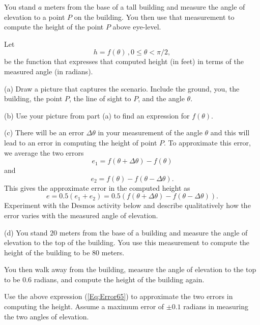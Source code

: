 \documentclass{ximera}
\begin{document}
\begin{question} \label{Q1:RightTriangle}
You stand $a$ meters from the base of a tall building and measure the angle of  elevation to a point $P$ on the building. You then use that measurement to compute the height of the point $P$ above eye-level.

Let 
\[
    h = f(\theta) \, , 0\leq \theta < \pi/2 ,
\]
be the function that expresses that computed height (in feet) in terms of the measured angle (in radians).

(a) Draw a picture that captures the scenario. Include the ground, you, the building, the point $P$, the line of sight to $P$, and the angle $\theta$.

(b) Use your picture from part (a) to find an expression for $f(\theta)$.

(c) There will be an error $\Delta \theta$ in your measurement of the angle $\theta$ and this will lead to an error in computing the height of point $P$.  To approximate this error, we average the two errors
\[
     e_1 = f(\theta + \Delta\theta) - f(\theta)
\]
and 
\[
   e_2 = f(\theta) - f(\theta - \Delta\theta).
\]
This gives the approximate error in the computed height as
\begin{equation}
   e =   0.5 (e_1 + e_2) = 0.5 \left(  f(\theta + \Delta\theta) - f(\theta - \Delta\theta)     \right) . \label{Eq:Error65}
\end{equation}
Experiment with the Desmos activity below and describe qualitatively how the error varies with the measured angle of elevation.

(d) You stand $20$ meters from the base of a building and measure the angle of elevation to the top of the building. You use this measurement to compute the height of the building to be $80$ meters. 

You then walk away from the building, measure the angle of elevation to the top to be $0.6$ radians, and compute the height of the building again.

 Use the above expression (\ref{Eq:Error65}) to approximate the two errors in computing the height. Assume a maximum error of $\pm 0.1$ radians in measuring the two angles of elevation. 

\begin{exploration}

 
\begin{onlineOnly}
    \begin{center}
\end{center}
\end{onlineOnly}
\end{exploration} 

\end{question}
\end{document}
